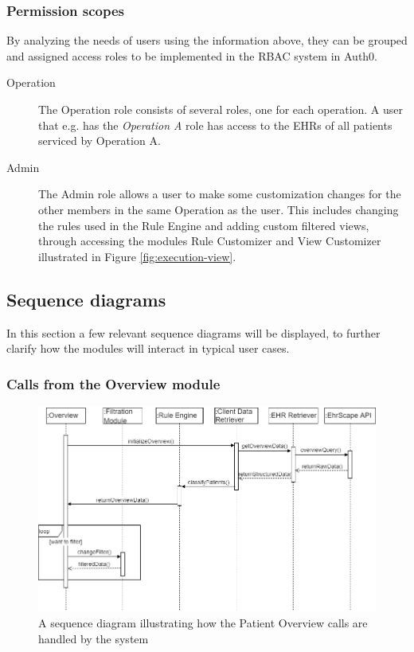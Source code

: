 \documentclass{article}
\begin{document}
\subsubsection{Permission scopes}
By analyzing the needs of users using the information above, they can be grouped and assigned access roles to be implemented in the RBAC system in Auth0.

\begin{description}
\item [Operation] The Operation role consists of several roles, one for each operation. A user that e.g. has the \emph{Operation A} role has access to the EHRs of all patients serviced by Operation A.
\item [Admin] The Admin role allows a user to make some customization changes for the other members in the same Operation as the user. This includes changing the rules used in the Rule Engine and adding custom filtered views, through accessing the modules Rule Customizer and View Customizer illustrated in Figure \ref{fig:execution-view}.
\end{description}


\subsection{Sequence diagrams}
In this section a few relevant sequence diagrams will be displayed, to further clarify how the modules will interact in typical user cases.

\subsubsection{Calls from the Overview module}
\begin{figure}[h]
    \centering
    \includegraphics[scale = 0.45]{overview-sequence}
    \caption{A sequence diagram illustrating how the Patient Overview calls are handled by the system}
    \label{fig:overview-sequence}
\end{figure}
\end{document}
